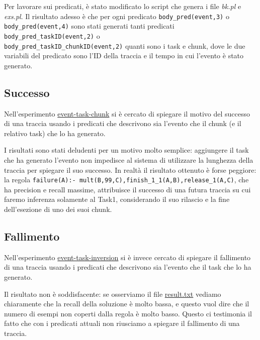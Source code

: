 Per lavorare sui predicati, è stato modificato lo script che genera i file \textit{bk.pl} e \textit{exs.pl}. Il risultato adesso è che per ogni predicato \texttt{body\_pred(event,3)} o \texttt{body\_pred(event,4)} sono stati generati tanti predicati \texttt{body\_pred\_taskID(event,2)} o \\ \texttt{body\_pred\_taskID\_chunkID(event,2)} quanti sono i task e chunk, dove le due variabili del predicato sono l'ID della traccia e il tempo in cui l'evento è stato generato.

\subsection{Successo}
Nell'esperimento \href{https://github.com/edoardosarri24/prediction-in-data-driven-system/6-event-task-chunk/}{event-task-chunk} si è cercato di spiegare il motivo del successo di una traccia usando i predicati che descrivono sia l'evento che il chunk (e il relativo task) che lo ha generato.

I risultati sono stati deludenti per un motivo molto semplice: aggiungere il task che ha generato l'evento non impedisce al sistema di utilizzare la lunghezza della traccia per spiegare il suo successo. In realtà il risultato ottenuto è forse peggiore: la regola \texttt{failure(A):- mult(B,99,C),finish\_1\_1(A,B),release\_1(A,C)}, che ha precision e recall massime, attribuisce il successo di una futura traccia su cui faremo inferenza solamente al Task1, considerando il suo rilascio e la fine dell'esezione di uno dei suoi chunk.

\subsection{Fallimento}
Nell'esperimento \href{https://github.com/edoardosarri24/prediction-in-data-driven-system/7-event-task-inversion/}{event-task-inversion} si è invece cercato di spiegare il fallimento di una traccia usando i predicati che descrivono sia l'evento che il task che lo ha generato.

Il risultato non è soddisfacente: se osserviamo il file \href{https://github.com/edoardosarri24/prediction-in-data-driven-system/7-event-task-chunk-inversion/result.txt}{result.txt} vediamo chiaramente che la recall della soluzione è molto bassa, e questo vuol dire che il numero di esempi non coperti dalla regola è molto basso. Questo ci testimonia il fatto che con i predicati attuali non riusciamo a spiegare il fallimento di una traccia.